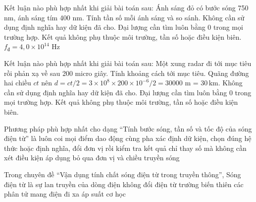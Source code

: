 \begin{ex}
Kết luận nào phù hợp nhất khi giải bài toán sau: Ánh sáng đỏ có bước sóng 750 nm, ánh sáng tím 400 nm. Tính tần số mỗi ánh sáng và so sánh.
\choice
{Không cần sử dụng định nghĩa hay dữ kiện đã cho.}
{Đại lượng cần tìm luôn bằng 0 trong mọi trường hợp.}
{Kết quả không phụ thuộc môi trường, tần số hoặc điều kiện biên.}
{\True $f_đ=4,0\times10^{14}$ Hz}
\end{ex}

\begin{ex}
Kết luận nào phù hợp nhất khi giải bài toán sau: Một xung radar đi tới mục tiêu rồi phản xạ về sau 200 micro giây. Tính khoảng cách tới mục tiêu.
\choice
{\True Quãng đường hai chiều $ct$ nên $d=ct/2=3\times10^8\times200\times10^{-6}/2=30000$ m = $30\,\text{km}$.}
{Không cần sử dụng định nghĩa hay dữ kiện đã cho.}
{Đại lượng cần tìm luôn bằng 0 trong mọi trường hợp.}
{Kết quả không phụ thuộc môi trường, tần số hoặc điều kiện biên.}
\end{ex}

\begin{ex}
Phương pháp phù hợp nhất cho dạng “Tính bước sóng, tần số và tốc độ của sóng điện từ” là
\choice
{luôn coi mọi điểm dao động cùng pha}
{\True xác định dữ kiện, chọn đúng hệ thức hoặc định nghĩa, đổi đơn vị rồi kiểm tra kết quả}
{chỉ thay số mà không cần xét điều kiện áp dụng}
{bỏ qua đơn vị và chiều truyền sóng}
\end{ex}

\begin{ex}
Trong chuyên đề “Vận dụng tính chất sóng điện từ trong truyền thông”, Sóng điện từ là sự lan truyền của
\choice
{dòng điện không đổi}
{\True điện từ trường biến thiên}
{các phân tử mang điện đi xa}
{áp suất cơ học}
\end{ex}

